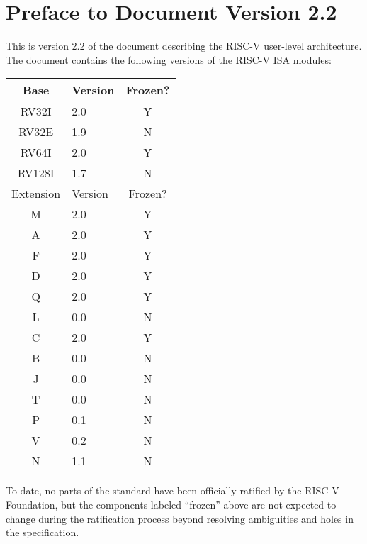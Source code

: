 \section*{Preface to Document Version 2.2}

This is version 2.2 of the document describing the RISC-V
user-level architecture.  The document contains the following
versions of the RISC-V ISA modules:
\begin{table}[hbt]
  \centering
  \begin{tabular}{|c|l|c|}
    \hline
    Base     & Version & Frozen? \\
    \hline
    RV32I    & 2.0 & Y \\
    RV32E    & 1.9 & N \\
    RV64I    & 2.0 & Y \\
    RV128I   & 1.7 & N \\
    \hline
    Extension & Version & Frozen? \\
    \hline
    M        & 2.0 & Y \\
    A        & 2.0 & Y \\
    F        & 2.0 & Y \\
    D        & 2.0 & Y \\
    Q        & 2.0 & Y \\
    L        & 0.0 & N \\
    C        & 2.0 & Y \\
    B        & 0.0 & N \\
    J        & 0.0 & N \\
    T        & 0.0 & N \\
    P        & 0.1 & N \\
    V        & 0.2 & N \\
    N        & 1.1 & N \\
    \hline
  \end{tabular}
\end{table}

To date, no parts of the standard have been officially ratified by the
RISC-V Foundation, but the components labeled ``frozen'' above are not
expected to change during the ratification process beyond resolving
ambiguities and holes in the specification.

